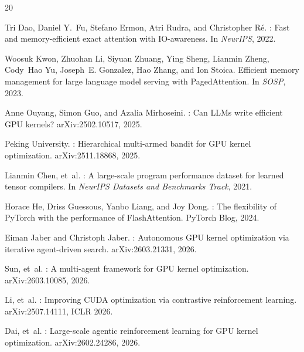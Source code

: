 \documentclass[11pt]{article}
\begin{document}
\begin{thebibliography}{20}

Tri Dao, Daniel Y.~Fu, Stefano Ermon, Atri Rudra, and Christopher R\'{e}.
: Fast and memory-efficient exact attention with
  {IO}-awareness.
\newblock In \emph{NeurIPS}, 2022.

Woosuk Kwon, Zhuohan Li, Siyuan Zhuang, Ying Sheng, Lianmin Zheng, Cody~Hao
  Yu, Joseph~E. Gonzalez, Hao Zhang, and Ion Stoica.
\newblock Efficient memory management for large language model serving with
  {PagedAttention}.
\newblock In \emph{SOSP}, 2023.

Anne Ouyang, Simon Guo, and Azalia Mirhoseini.
: Can {LLMs} write efficient {GPU} kernels?
\newblock arXiv:2502.10517, 2025.

{Peking University}.
: Hierarchical multi-armed bandit for {GPU} kernel
  optimization.
\newblock arXiv:2511.18868, 2025.

Lianmin Chen, et~al.
: A large-scale program performance dataset for learned
  tensor compilers.
\newblock In \emph{NeurIPS Datasets and Benchmarks Track}, 2021.

Horace He, Driss Guessous, Yanbo Liang, and Joy Dong.
: The flexibility of {PyTorch} with the performance of
  {FlashAttention}.
\newblock PyTorch Blog, 2024.

Eiman Jaber and Christoph Jaber.
: Autonomous {GPU} kernel optimization via iterative
  agent-driven search.
\newblock arXiv:2603.21331, 2026.

Sun, et~al.
: A multi-agent framework for {GPU} kernel optimization.
\newblock arXiv:2603.10085, 2026.

Li, et~al.
: Improving {CUDA} optimization via contrastive
  reinforcement learning.
\newblock arXiv:2507.14111, ICLR 2026.

Dai, et~al.
: Large-scale agentic reinforcement learning for {GPU}
  kernel optimization.
\newblock arXiv:2602.24286, 2026.


\end{thebibliography}
\end{document}
